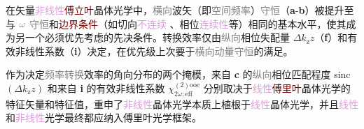 在矢量\textcolor{Plum}{非线性}\textcolor{Maroon}{傅立叶}\textcolor{PineGreen}{晶体光学}中，\textcolor{gray}{横向}\textcolor{PineGreen}{波矢}（即\textcolor{gray}{空间频率}）\textcolor{gray}{守恒}（\textbf{a}-\textbf{b}）被提升至与 $\mathcolor{gray}{\omega}$ \textcolor{gray}{守恒}和\textcolor{Maroon}{边界条件}（如切向\textcolor{Plum}{不连续} 、相位\textcolor{Plum}{连续性}等）相同的基本水平，使其成为另一个必须优先考虑的先决条件。转换效率仅由\textcolor{gray}{纵向}\textcolor{PineGreen}{相位失配量} $\Delta k_\mathrm{z} z$（\textbf{f}）和\textcolor{NavyBlue}{有效非线性系数}（\textbf{i}）决定\cite{midwinterEffectsPhaseMatching1965,yaoAccurateCalculationOptimum1992,dmitrievEffectiveNonlinearityCoefficients1993,diesperovEffectiveNonlinearCoefficient1997}，在优先级上次要于\textcolor{gray}{横向动量守恒}的满足。

作为决定\textcolor{gray}{频率转换}效率的角向分布的两个掩模，来自 \textbf{c} 的\textcolor{gray}{纵向}\textcolor{PineGreen}{相位匹配程度} sinc$(\Delta k_\mathrm{z} z)$ 和来自 \textbf{i} 的\textcolor{NavyBlue}{有效非线性系数} $\chi^{(2)\text{ooe}}_{2\omega;\text{eff}}$ 分别取决于\textcolor{Plum}{线性}\textcolor{Maroon}{傅里叶}\textcolor{PineGreen}{晶体光学}的\textcolor{PineGreen}{特征矢量}和\textcolor{PineGreen}{特征值}，重申了\textcolor{Plum}{非线性}\textcolor{PineGreen}{晶体光学}本质上植根于\textcolor{Plum}{线性}\textcolor{PineGreen}{晶体光学}，并且\textcolor{Plum}{线性}和\textcolor{Plum}{非线性}\textcolor{NavyBlue}{光学}最终都应纳入\textcolor{NavyBlue}{傅里叶光学}框架。


